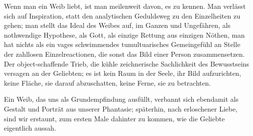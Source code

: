 Wenn man ein Weib liebt, ist man meilenweit davon, es zu kennen. Man verlässt sich auf Inspiration, statt den analytischen Geduldsweg zu den Einzelheiten zu gehen; man stellt das Ideal des Weibes auf, im Ganzen und Ungefähren, als nothwendige Hypothese, als Gott, als einzige Rettung aus einzigen Nöthen, man hat nichts als ein vages schwimmendes tumultuarisches Gemeingefühl an Stelle der zahllosen Einzelreactionen, die sonst das Bild einer Person zusammensetzen. Der object-schaffende Trieb, die kühle zeichnerische Sachlichkeit des Bewusstseins versagen an der Geliebten; es ist kein Raum in der Seele, ihr Bild aufzurichten, keine Fläche, sie darauf abzuschatten, keine Ferne, sie zu betrachten.
\par

Ein Weib, das uns als Grundempfindung ausfüllt, verbannt sich ebendamit als Gestalt und Porträt aus unserer Phantasie; späterhin, nach erloschener Liebe, sind wir erstaunt, zum ersten Male dahinter zu kommen, wie die Geliebte eigentlich aussah.
\par

